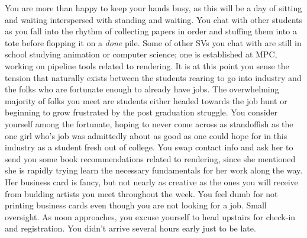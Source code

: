 \documentclass[../main.tex]{subfiles}
\begin{document}
You are more than happy to keep your hands busy, as this will be a day of sitting and waiting interspersed with standing and waiting. You chat with other students as you fall into the rhythm of collecting papers in order and stuffing them into a tote before flopping it on a \textit{done} pile. Some of other SVs you chat with are still in school studying animation or computer science; one is established at MPC, working on pipeline tools related to rendering. It is at this point you sense the tension that naturally exists between the students rearing to go into industry and the folks who are fortunate enough to already have jobs. The overwhelming majority of folks you meet are students either headed towards the job hunt or beginning to grow frustrated by the post graduation struggle. You consider yourself among the fortunate, hoping to never come across as standoffish as the one girl who's job was admittedly about as good as one could hope for in this industry as a student fresh out of college. You swap contact info and ask her to send you some book recommendations related to rendering, since she mentioned she is rapidly trying learn the necessary fundamentals for her work along the way. Her business card is fancy, but not nearly as creative as the ones you will receive from budding artists you meet throughout the week. You feel dumb for not printing business cards even though you are not looking for a job. Small oversight. As noon approaches, you excuse yourself to head upstairs for check-in and registration. You didn't arrive several hours early just to be late.
\end{document}
